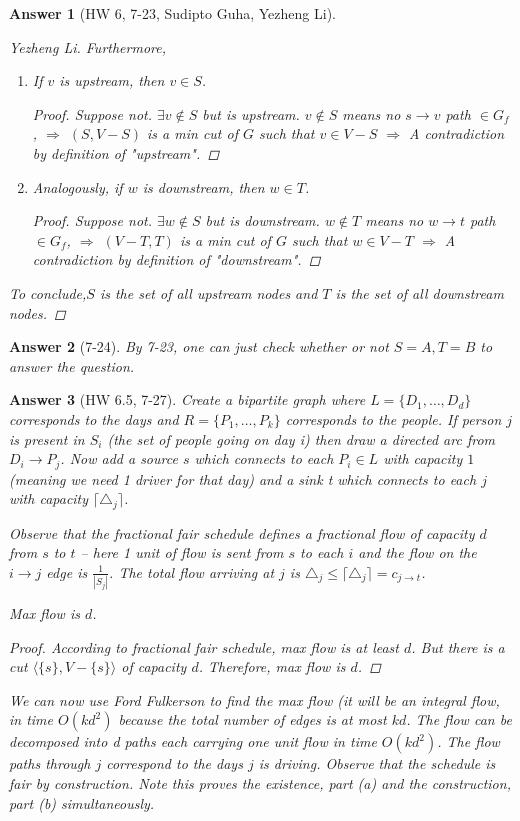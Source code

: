 \documentclass[11pt]{article}
\theoremstyle{numberplain}
\theoremstyle{nonumberplain}
\newtheorem{proof}{Proof}
\newtheorem{ans}{Answer}
\newcommand{\0}{{\mathbf{0}}}
\begin{document}
\begin{ans}[HW 6, 7-23, Sudipto Guha, Yezheng Li]
\begin{proof}[Yezheng Li]
Furthermore,
\begin{enumerate}
\item If $v$ is upstream, then 	$v\in S$.
\begin{proof}
Suppose not. $\exists v\notin S$ but is upstream. $v\notin S$ means no $s\rightarrow v$ path $\in G_f$,  $\Rightarrow$ $(S,V-S)$ is a min cut of $G$ such that $v\in V-S$ $\Rightarrow$ A contradiction by   definition of "upstream".
\end{proof}
\item Analogously, if $w$ is downstream, then $w\in T$.
\begin{proof}
Suppose not. $\exists w\notin S$ but is downstream. $w\notin T$ means no $w\rightarrow t$ path $\in G_f$, $\Rightarrow$ $(V-T,T)$ is a min cut of $G$ such that $w\in V-T$ $\Rightarrow$ A contradiction by definition of "downstream".
\end{proof}

\end{enumerate}
To conclude,$S$ is the set of all upstream nodes and $T$ is the set of all downstream nodes.
\end{proof}
\end{ans}

\begin{ans}[7-24] By 7-23, one can just check whether or not $S=A,T=B$ to answer the question.
\end{ans}

\begin{ans}[HW 6.5, 7-27] Create a bipartite graph where $L=\{D_1,\ldots,D_d\}$ corresponds to the days and $R=\{P_1,\ldots,P_k\}$ corresponds
to the people. If person $j$ is present in $S_i$ (the set of people going on day i) then draw a directed
arc from $D_i \rightarrow P_j$. Now add a source $s$ which connects to each $P_i \in L$ with capacity $1$ (meaning we need 1 driver for that day) and a sink t which connects to each $j$ with capacity $\lceil \triangle_j\rceil$.

Observe that the fractional fair schedule defines a fractional flow of capacity $d$ from $s$ to $t$ -- here 1 unit of flow is sent from $s$ to each $i$ and the flow on the $i\rightarrow j$ edge is $\frac{1}{|S_j|}$. The total flow
arriving at $j$ is $\triangle_j\leq \lceil \triangle_j\rceil =c_{j \rightarrow t}$. 
\begin{State}[Claim 1] 
Max flow is $d$.
\end{State}
\begin{proof}
According to fractional fair schedule, max flow is at least $d$. But there is a cut $\langle \{s\}, V-\{s\}\rangle$ of capacity  $d$. Therefore, max flow is $d$.
\end{proof} 
We can now use Ford Fulkerson to find the max flow (it will be an integral flow, in time $O(kd^2)$ because the total number of edges is at most $kd$. The flow can be decomposed into d paths
each carrying one unit flow in time $O(kd^2)$. The flow paths through $j$ correspond to the days $j$ is
driving. Observe that the schedule is fair by construction. Note this proves the existence, part (a)
and the construction, part (b) simultaneously.
\end{ans}
\end{document}
